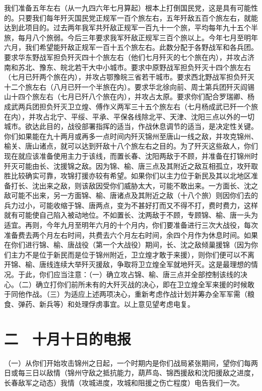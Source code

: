 我们准备五年左右（从一九四六年七月算起）根本上打倒国民党，这是具有可能性的。只要我们每年歼灭国民党正规军一百个旅左右，五年歼敌五百个旅左右，就能达到此项目的。过去两年我军共歼敌正规军一百九十一个旅，平均每年九十五个半旅，每月八个旅弱。今后三年要求我军歼敌正规军三百个旅以上。今年七月至明年六月，我们希望能歼敌正规军一百十五个旅左右。此数分配于各野战军和各兵团。要求华东野战军担负歼灭四十个旅左右（他们七月歼灭的七个旅在内），并攻占济南和苏北、豫东、皖北若干大中小城市。要求中原野战军担负歼灭十四个旅左右（七月已歼两个旅在内），并攻占鄂豫皖三省若干城市。要求西北野战军担负歼灭十二个旅左右（八月已歼一个半旅在内）。要求华北徐向前、周士第兵团歼灭阎锡山十四个旅左右（七月已歼八个旅在内），并攻占太原。要求你们配合罗瑞卿、杨成武两兵团担负歼灭卫立煌、傅作义两军三十五个旅左右（七月杨成武已歼一个旅在内），并攻占北宁、平绥、平承、平保各线除北平、天津、沈阳三点以外的一切城市。欲达此目的，战役部署指挥的适当，作战休息调节的适当，是决定性关键。你们如果能在九十两月或再多一点时间内歼灭锦州至唐山一线之敌，并攻克锦州、榆关、唐山诸点，就可以达到歼敌十八个旅左右之目的。为了歼灭这些敌人，你们现在就应该准备使用主力于该线，而置长春、沈阳两敌于不顾，并准备在打锦州时歼灭可能由长、沈援锦之敌。因为锦、榆、唐三点及其附近之敌互相孤立，攻歼取胜比较确实可靠，攻锦打援亦较有希望。如果你们以主力位于新民及其以北地区准备打长、沈出来之敌，则该敌因受你们威胁太大，可能不敢出来。一方面长、沈之敌可能不出来，另一方面锦、榆、唐诸点及其附近之敌（十八个旅）则因你们去的兵力过小，可能收缩于锦、唐两点，变为不甚好打而又不得不打，费时费力，这样就有可能使自己陷入被动地位。不如置长、沈两敌于不顾，专顾锦、榆、唐一头为适宜。再则，今年九月至明年六月的十个月内，你们要准备进行三次大战役，每次准备费去两个月左右时间，共费去六个月左右时间，余四个月作为休息时间。如果在你们进行锦、榆、唐战役（第一个大战役）期间，长、沈之敌倾巢援锦（因为你们主力不是位于新民而是位于锦州附近，卫立煌才敢于来援），则你们便可以不离开锦、榆、唐线连续大举歼灭援敌，争取将卫立煌全军就地歼灭。这是最理想的情况。于此，你们应当注意：（一）确立攻占锦、榆、唐三点并全部控制该线的决心。（二）确立打你们前所未有的大歼灭战的决心，即在卫立煌全军来援的时候敢于同他作战。（三）为适应上述两项决心，重新考虑作战计划并筹办全军军需（粮食、弹药、新兵等）和处理俘虏事宜。以上意见望考虑电复。

\section{二　十月十日的电报}

（一）从你们开始攻击锦州之日起，一个时期内是你们战局紧张期间，望你们每两日或每三日以敌情（锦州守敌之抵抗能力，葫芦岛、锦西援敌和沈阳援敌之进度，长春敌军之动态）我情（攻城进度，攻城和阻援之伤亡程度）电告我们一次。

